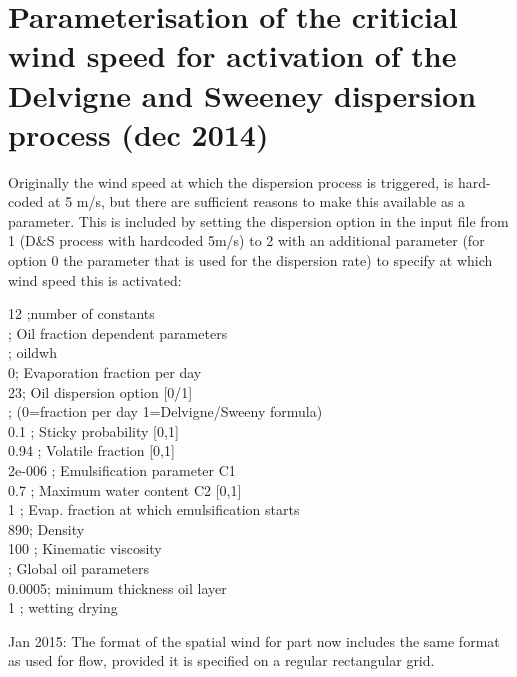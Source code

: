 \documentclass[english]{deltares_manual}
\newcommand\tab[1][1cm]{\hspace*{#1}}
\begin{document}
\section{Parameterisation of the criticial wind speed for activation of the Delvigne and Sweeney dispersion process (dec 2014)}
Originally the wind speed at which the dispersion process is triggered, is hard-coded at 5 m/s, but there are sufficient reasons to make this available as a parameter. This is included by setting the dispersion option in the input file from 1 (D\&S process with hardcoded 5m/s) to 2 with an additional parameter (for option 0 the parameter that is used for the dispersion rate) to specify at which wind speed this is activated:
\begin{tcolorbox}
12 \tab ;number of constants \\
\tab ; Oil fraction dependent parameters\\
\tab ; oildwh \\
0\tab ; Evaporation fraction per day\\
2\tab 3\tab    ; Oil dispersion option [0/1]\\
\tab ; (0=fraction per day 1=Delvigne/Sweeny formula)\\
0.1 \tab ; Sticky probability [0,1]\\
0.94 \tab               ; Volatile fraction [0,1]\\
2e-006 \tab               ; Emulsification parameter C1\\
0.7   \tab             ; Maximum water content C2  [0,1]\\
1       \tab         ; Evap. fraction at which emulsification starts\\
890\tab                ; Density \\
100     \tab           ; Kinematic viscosity \\
\tab ; Global oil parameters\\
0.0005\tab                ; minimum thickness oil layer\\
1          \tab          ; wetting drying \\
\end{tcolorbox}


Jan 2015:
The format of the spatial wind for part now includes the same format as used for flow, provided it is specified on a regular rectangular grid.
\end{document}
